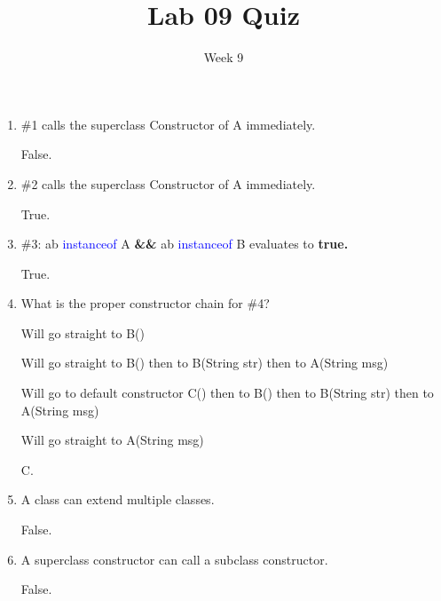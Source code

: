 \documentclass[addpoints]{exam}
\title{Lab 09 Quiz}
\date{Week 9}
\begin{document}
 

\Instructions

\begin{enumerate}
\vspace{2em}

Consider the following code for questions 1, 2, 3 and 4.
\begin{lstlisting}
class A  {
    public A(String msg)  { }
}  
class B extends A  {
    public B() {
         this("Hello World");		/* #1 */
    }
    public B(String str) {
        super(str);				    /* #2 */
    }
}  
class C extends B {
	public static void main(String[] args) {
    		A ab = new B();			/* #3 */
			C c = new C(); 		/* #4 */
	}
}
\end{lstlisting}

\item {} \tf  \#1 calls the superclass Constructor of A immediately.
\vspace{1em}

\Ans False.

\item {} \tf  \#2 calls the superclass Constructor of A immediately.
\vspace{1em}

\Ans True.

\item {} \tf \#3: ab \textcolor{blue}{instanceof} A \textbf{\&\&} ab \textcolor{blue}{instanceof} B  evaluates to  \textbf{true.}
\vspace{1em}

\Ans True.

\item

\question {} What is the proper constructor chain for \#4?

\begin{oneparchoices} 
\hspace{0.2cm}
 \choice Will go straight to B()\newline
 
 \choice Will go straight to B() then to B(String str) then to A(String msg) \newline
 
 \choice Will go to default constructor C() then to B() then to B(String str) then to A(String msg) \newline
 
 \choice Will go straight to A(String msg) \newline

\end{oneparchoices}
\Ans C.
\item {} \tf A class can extend multiple classes.

\Ans False. 

\vspace{1em}
\item {} \tf A superclass constructor can call a subclass constructor.

\Ans False.


\vspace{2em}
\end{enumerate}
\end{document}
